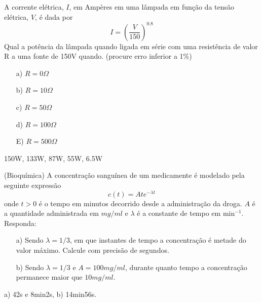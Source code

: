 \begin{Exercise}[title=Eletricidade]A corrente elétrica, $I$, em Ampères em uma lâmpada em função da tensão elétrica, $V$, é dada por
$$I=\left(\frac{V}{150}\right)^{0.8}$$
Qual a potência da lâmpada quando ligada em série com uma resistência de valor R a uma fonte de 150V quando. (procure erro inferior a 1\%)
\begin{itemize}
\item [a)] $R=0\Omega$
\item [b)] $R=10\Omega$
\item [c)] $R=50\Omega$
\item [d)] $R=100\Omega$
\item [E)] $R=500\Omega$
\end{itemize}
\end{Exercise}
\begin{Answer}
150W, 133W, 87W, 55W, 6.5W
\end{Answer}




\begin{Exercise} (Bioquímica) A concentração sanguínea de um medicamente é modelado pela seguinte expressão
$$c(t)=Ate^{-\lambda t}$$
onde $t>0$ é o tempo em minutos decorrido desde a administração da droga. $A$ é a quantidade administrada em $mg/ml$ e $\lambda$ é a constante de tempo em min$^{-1}$.
Responda:
\begin{itemize}
\item[a)] Sendo $\lambda=1/3$, em que instantes de tempo a concentração é metade do valor máximo. Calcule com precisão de segundos.
\item[b)] Sendo $\lambda=1/3$ e $A=100mg/ml$, durante quanto tempo a concentração permanece maior que $10mg/ml$.
\end{itemize}
\end{Exercise}

\begin{Answer}
a) 42s e 8min2s, b) 14min56s.
\end{Answer}


